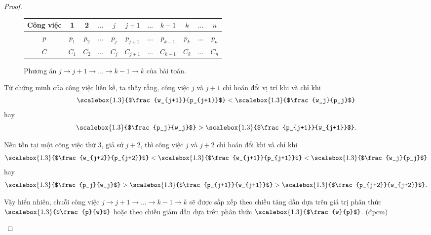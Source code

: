 \begin{proof}
\begin{itemize}
\begin{figure}[h!]
	\centering
	 \begin{tabular}{|c | c c c c c c c c c c |} 
	 \hline
	 Công việc & 1 & 2 & $\ldots$ & $j$ & $j+1$ & $\ldots$ & $k-1$ & $k$ & $\ldots$ & $n$ \\
	 \hline\hline
	 $p$ & $p_1$ & $p_2$ & $\ldots$ & $p_j$ & $p_{j+1}$ & $\ldots$ & $p_{k-1}$ & $p_k$ & $\ldots$ & $p_n$ \\
	 $C$ & $C_1$ & $C_2$ & $\ldots$ & $C_j$ & $C_{j+1}$ & $\ldots$ & $C_{k-1}$ & $C_k$ & $\ldots$ & $C_n$ \\
	 \hline
	 \end{tabular}
\caption{\label{jk1}Phương án $j \rightarrow j+1 \rightarrow \ldots \rightarrow k-1 \rightarrow k$ của bài toán.}
\end{figure}

Từ chứng minh của công việc liền kề, ta thấy rằng, công việc $j$ và $j+1$ chỉ hoán đổi vị trí khi và chỉ khi $$\scalebox{1.3}{$\frac{w_{j+1}}{p_{j+1}}$} < \scalebox{1.3}{$\frac{w_j}{p_j}$}$$ hay $$\scalebox{1.3}{$\frac{p_j}{w_j}$} > \scalebox{1.3}{$\frac{p_{j+1}}{w_{j+1}}$}.$$

Nếu tồn tại một công việc thứ 3, giả sử $j+2$, thì công việc $j$ và $j+2$ chỉ hoán đổi khi và chỉ khi $$\scalebox{1.3}{$\frac{w_{j+2}}{p_{j+2}}$} < \scalebox{1.3}{$\frac{w_{j+1}}{p_{j+1}}$} < \scalebox{1.3}{$\frac{w_j}{p_j}$}$$ hay $$\scalebox{1.3}{$\frac{p_j}{w_j}$} > \scalebox{1.3}{$\frac{p_{j+1}}{w_{j+1}}$} > \scalebox{1.3}{$\frac{p_{j+2}}{w_{j+2}}$}.$$

Vậy hiển nhiên, chuỗi công việc $j \rightarrow j+1 \rightarrow \ldots \rightarrow k-1 \rightarrow k$ sẽ được sắp xếp theo chiều tăng dần dựa trên giá trị phân thức $\scalebox{1.3}{$\frac{p}{w}$}$ hoặc theo chiều giảm dần dựa trên phân thức $\scalebox{1.3}{$\frac{w}{p}$}$. (đpcm)

\end{itemize}




\end{proof}
